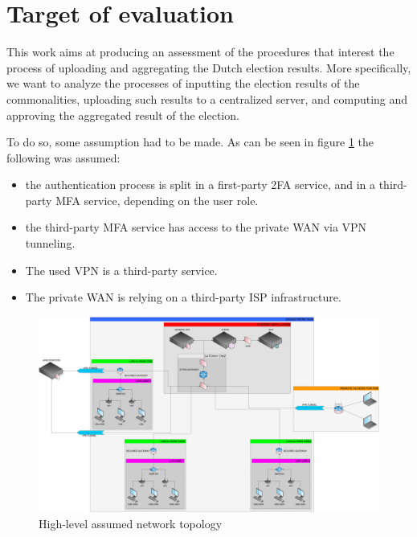 \chapter*{Target of evaluation} 
\label{target_of_eval}

This work aims at producing an assessment of the procedures that interest the process of uploading and aggregating the Dutch election results. More specifically, we want to analyze the processes of inputting the election results of the commonalities, uploading such results to a centralized server, and computing and approving the aggregated result of the election.

To do so, some assumption had to be made. As can be seen in figure \ref{fig:map} the following was assumed:

\begin{itemize}
    \item the authentication process is split in a first-party 2FA service, and in a third-party MFA service, depending on the user role.
    \item the third-party MFA service has access to the private WAN via VPN tunneling.
    \item The used VPN is a third-party service.
    \item The private WAN is relying on a third-party ISP infrastructure.
\end{itemize}

\begin{figure}[h!]
    \centering
    \includegraphics[keepaspectratio,width=1\textwidth]{01-target/img/map.png}
    \caption{High-level assumed network topology}
    \label{fig:map}
\end{figure}
